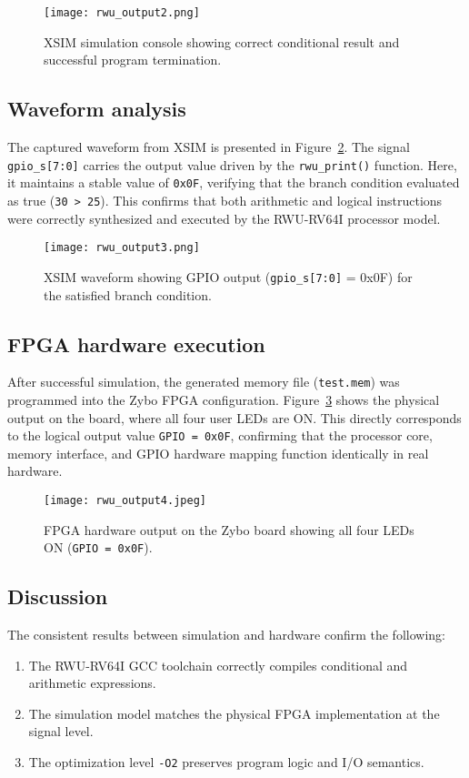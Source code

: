\begin{figure}[H]
  \centering
  \texttt{[image: rwu\_output2.png]}
  \caption{XSIM simulation console showing correct conditional result and successful program termination.}
  \label{fig:sim-console}
\end{figure}

\subsection{Waveform analysis}
The captured waveform from XSIM is presented in Figure~\ref{fig:sim-wave}.  
The signal \texttt{gpio\_s[7:0]} carries the output value driven by the \texttt{rwu\_print()} function.  
Here, it maintains a stable value of \texttt{0x0F}, verifying that the branch condition evaluated as true (\texttt{30 > 25}).  
This confirms that both arithmetic and logical instructions were correctly synthesized and executed by the RWU-RV64I processor model.

\begin{figure}[H]
  \centering
  \texttt{[image: rwu\_output3.png]}
  \caption{XSIM waveform showing GPIO output (\texttt{gpio\_s[7:0]} = 0x0F) for the satisfied branch condition.}
  \label{fig:sim-wave}
\end{figure}

\subsection{FPGA hardware execution}
After successful simulation, the generated memory file (\texttt{test.mem}) was programmed into the Zybo FPGA configuration.  
Figure~\ref{fig:fpga-output} shows the physical output on the board, where all four user LEDs are ON.  
This directly corresponds to the logical output value \texttt{GPIO = 0x0F}, confirming that the processor core, memory interface, and GPIO hardware mapping function identically in real hardware.

\begin{figure}[H]
  \centering
  \texttt{[image: rwu\_output4.jpeg]}
  \caption{FPGA hardware output on the Zybo board showing all four LEDs ON (\texttt{GPIO = 0x0F}).}
  \label{fig:fpga-output}
\end{figure}

\subsection{Discussion}
The consistent results between simulation and hardware confirm the following:
\begin{enumerate}
  \item The RWU-RV64I GCC toolchain correctly compiles conditional and arithmetic expressions.
  \item The simulation model matches the physical FPGA implementation at the signal level.
  \item The optimization level \texttt{-O2} preserves program logic and I/O semantics.
\end{enumerate}

